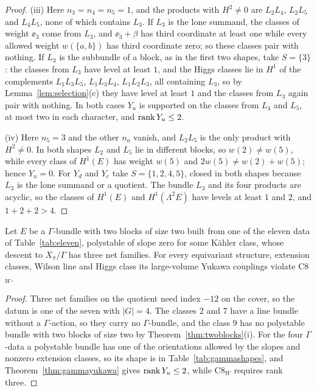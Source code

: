 \begin{proof}
(iii) Here $n_3=n_4=n_5=1$, and the products with $H^2\ne0$ are $L_2L_4$,
$L_2L_5$ and $L_4L_5$, none of which contains $L_3$. If $L_3$ is the lone
summand, the classes of weight $\ee_3$ come from $L_3$, and $\ee_3+\beta$
has third coordinate at least one while every allowed weight $w(\{a,b\})$
has third coordinate zero; so these classes pair with nothing. If $L_3$ is
the subbundle of a block, as in the first two shapes, take $S=\{3\}$: the
classes from $L_3$ have level at least $1$, and the Higgs classes lie in
$H^1$ of the complements $L_1L_3L_5$, $L_1L_3L_4$, $L_1L_2L_3$, all
containing $L_3$, so by Lemma~\ref{lem:selection}(c) they have level at least
$1$ and the classes from $L_3$ again pair with nothing. In both cases
$Y_u$ is supported on the classes from $L_4$ and $L_5$, at most two in each
character, and $\operatorname{rank} Y_u\le2$.

(iv) Here $n_5=3$ and the other $n_a$ vanish, and $L_2L_5$ is the only product
with $H^2\ne0$. In both shapes $L_2$ and $L_5$ lie in different blocks, so
$w(2)\ne w(5)$, while every class of $H^1(E)$ has weight $w(5)$ and
$2w(5)\ne w(2)+w(5)$; hence $Y_u=0$. For $Y_d$ and $Y_e$ take
$S=\{1,2,4,5\}$, closed in both shapes because $L_3$ is the lone summand
or a quotient. The bundle $L_3$ and its four products are acyclic, so the
classes of $H^1(E)$ and $H^1(\Lambda^2E)$ have levels at least $1$ and $2$,
and $1+2+2>4$.
\end{proof}

\begin{corollary}\label{cor:gammac8}
Let $E$ be a $\Gamma$-bundle with two blocks of size two built from one of
the eleven data of Table~\ref{tab:eleven}, polystable of slope zero for some
K\"ahler class, whose descent to $X_\pi/\Gamma$ has three net families. For
every equivariant structure, extension classes, Wilson line and Higgs
class its large-volume Yukawa couplings violate C8$_W$.
\end{corollary}
\begin{proof}
Three net families on the quotient need index $-12$ on the cover, so the
datum is one of the seven with $|G|=4$. The classes $2$ and $7$ have a line
bundle without a $\Gamma$-action, so they carry no $\Gamma$-bundle, and the
class $9$ has no polystable bundle with two blocks of size two by
Theorem~\ref{thm:twoblocks}(i). For the four $\Gamma$-data a polystable
bundle has one of the orientations allowed by the slopes and nonzero
extension classes, so its shape is in Table~\ref{tab:gammashapes}, and
Theorem~\ref{thm:gammayukawa} gives $\operatorname{rank} Y_u\le2$, while C8$_W$ requires
rank three.
\end{proof}

